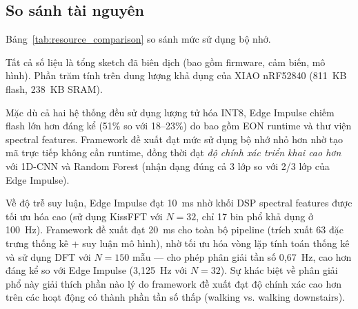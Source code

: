 \subsection{So sánh tài nguyên}

Bảng~\ref{tab:resource_comparison} so sánh mức sử dụng bộ nhớ.

\begin{table}[H]
    \centering
    \caption{So sánh tài nguyên triển khai --- Cortex-M4F @ 64~MHz}
    \label{tab:resource_comparison}
    \begin{minipage}{\linewidth}
    \vspace{4pt}
    \footnotesize
    Tất cả số liệu là tổng sketch đã biên dịch (bao gồm firmware, cảm biến, mô hình). Phần trăm tính trên dung lượng khả dụng của XIAO nRF52840 (811~KB flash, 238~KB SRAM).
    \end{minipage}
\end{table}

Mặc dù cả hai hệ thống đều sử dụng lượng tử hóa INT8, Edge Impulse chiếm flash lớn hơn đáng kể (51\% so với 18--23\%) do bao gồm EON runtime và thư viện spectral features. Framework đề xuất đạt mức sử dụng bộ nhớ nhỏ hơn nhờ tạo mã trực tiếp không cần runtime, đồng thời đạt \textit{độ chính xác triển khai cao hơn} với 1D-CNN và Random Forest (nhận dạng đúng cả 3 lớp so với 2/3 lớp của Edge Impulse).

Về độ trễ suy luận, Edge Impulse đạt 10~ms nhờ khối DSP spectral features được tối ưu hóa cao (sử dụng KissFFT với $N=32$, chỉ 17 bin phổ khả dụng ở 100~Hz). Framework đề xuất đạt 20~ms cho toàn bộ pipeline (trích xuất 63 đặc trưng thống kê + suy luận mô hình), nhờ tối ưu hóa vòng lặp tính toán thống kê và sử dụng DFT với $N=150$ mẫu --- cho phép phân giải tần số 0,67~Hz, cao hơn đáng kể so với Edge Impulse (3,125~Hz với $N=32$). Sự khác biệt về phân giải phổ này giải thích phần nào lý do framework đề xuất đạt độ chính xác cao hơn trên các hoạt động có thành phần tần số thấp (walking vs. walking downstairs).

